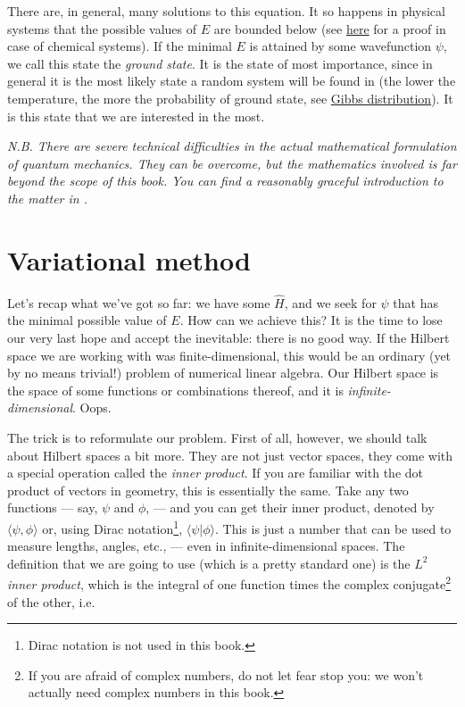 \documentclass{article}
\begin{document}
There are, in general, many solutions to this equation. It so happens in physical systems that the possible values of \(E\) are bounded below (see \href{https://www.themathcitadel.com/energy-levels-of-molecules-are-bounded-below/}{here} for a proof in case of chemical systems). If the minimal \(E\) is attained by some wavefunction \(\psi\), we call this state the \textit{ground state}. It is the state of most importance, since in general it is the most likely state a random system will be found in (the lower the temperature, the more the probability of ground state, see \href{https://en.wikipedia.org/wiki/Boltzmann_distribution}{Gibbs distribution}). It is this state that we are interested in the most.

\textit{N.B. There are severe technical difficulties in the actual mathematical formulation of quantum mechanics. They can be overcome, but the mathematics involved is far beyond the scope of this book. You can find a reasonably graceful introduction to the matter in \cite{ref:hall}.}

\newpage

\section{Variational method} \label{sec:var}

Let's recap what we've got so far: we have some \(\hat H\), and we seek for \(\psi\) that has the minimal possible value of \(E\). How can we achieve this? It is the time to lose our very last hope and accept the inevitable: there is no good way. If the Hilbert space we are working with was finite-dimensional, this would be an ordinary (yet by no means trivial!) problem of numerical linear algebra. Our Hilbert space is the space of some functions or combinations thereof, and it is \textit{infinite-dimensional}. Oops.

The trick is to reformulate our problem. First of all, however, we should talk about Hilbert spaces a bit more. They are not just vector spaces, they come with a special operation called the \textit{inner product}. If you are familiar with the dot product of vectors in geometry, this is essentially the same. Take any two functions --- say, \(\psi\) and \(\phi\), --- and you can get their inner product, denoted by \(\langle \psi, \phi \rangle\) or, using Dirac notation\footnote{Dirac notation is not used in this book.}, \(\langle \psi | \phi \rangle\). This is just a number that can be used to measure lengths, angles, etc., --- even in infinite-dimensional spaces. The definition that we are going to use (which is a pretty standard one) is the \textit{\(L^2\) inner product}, which is the integral of one function times the complex conjugate\footnote{If you are afraid of complex numbers, do not let fear stop you: we won't actually need complex numbers in this book.} of the other, i.e.
\end{document}
